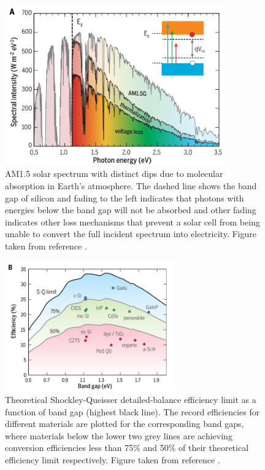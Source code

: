 \begin{figure}[h!]
  \centering
    \includegraphics[width=0.85\textwidth]{figures/solar_spectrum2.png}
    \caption{AM1.5 solar spectrum with distinct dips due to molecular absorption in Earth’s atmosphere. The dashed line shows the band gap of silicon and fading to the left indicates that photons with energies below the band gap will not be absorbed and other fading indicates other loss mechanisms that prevent a solar cell from being unable to convert the full incident spectrum into electricity. Figure taken from reference .}
  \label{solar_spectrum}
\end{figure}

\begin{figure}[h!]
  \centering
    \includegraphics[width=0.65\textwidth]{figures/SQ_new.png}
    \caption{Theoretical Shockley-Queisser detailed-balance efficiency limit as a function of band gap\cite{SQ_1961} (highest black line). The record efficiencies for different materials are plotted for the corresponding band gaps, where materials below the lower two grey lines are achieving conversion efficiencies less than 75\% and 50\% of their theoretical efficiency limit respectively. Figure taken from reference .}
  \label{SQ}
\end{figure}


